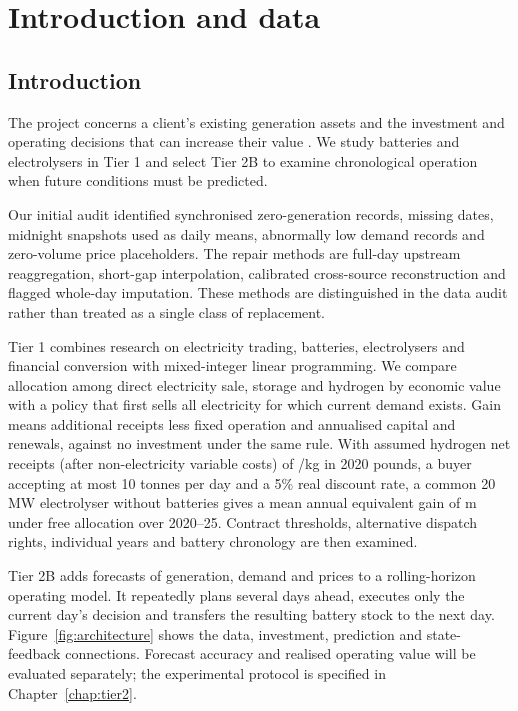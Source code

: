 \chapter{Introduction and data}\label{chap:common}
\section{Introduction}\label{sec:intro}
The project concerns a client's existing generation assets and the investment
and operating decisions that can increase their value \cite{brief}. We study
batteries and electrolysers in Tier 1 and select Tier 2B to examine chronological
operation when future conditions must be predicted.

Our initial audit identified synchronised zero-generation records, missing
dates, midnight snapshots used as daily means, abnormally low demand records
and zero-volume price placeholders. The repair methods are full-day upstream
reaggregation, short-gap interpolation, calibrated cross-source reconstruction
and flagged whole-day imputation. These methods are distinguished in the
data audit rather than treated as a single class of replacement.

Tier 1 combines research on electricity trading, batteries, electrolysers and
financial conversion with mixed-integer linear programming. We compare
allocation among direct electricity sale, storage and hydrogen by economic
value with a policy that first sells all electricity for which current
demand exists. Gain means additional receipts less fixed operation and
annualised capital and renewals, against no investment under the same rule.
With assumed hydrogen net receipts (after non-electricity variable costs) of
\gbp\Netback/kg in 2020 pounds, a buyer accepting at most 10 tonnes per day and a 5\% real
discount rate, a common 20 MW electrolyser without batteries gives a mean
annual equivalent gain of \gbp\MeanA m under free allocation over 2020--25.
Contract thresholds, alternative dispatch rights, individual years and
battery chronology are then examined.

Tier 2B adds forecasts of generation, demand and prices to a rolling-horizon
operating model. It repeatedly plans several days ahead, executes only the
current day's decision and transfers the resulting battery stock to the next
day. Figure~\ref{fig:architecture} shows the data, investment, prediction and
state-feedback connections. Forecast accuracy and realised operating value
will be evaluated separately; the experimental protocol is specified in
Chapter~\ref{chap:tier2}.

